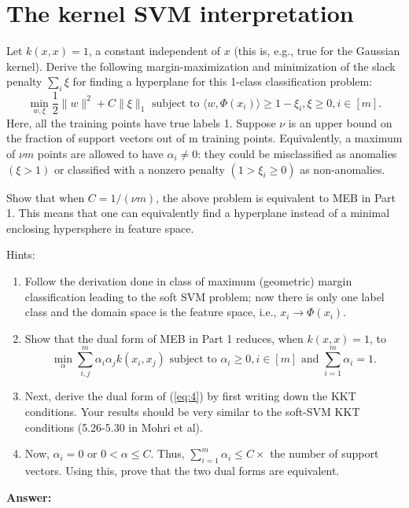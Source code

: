 \documentclass{article}
\begin{document}
\section{The kernel SVM interpretation}
Let $k(x, x) = 1$, a constant independent of $x$ (this is, e.g., true for the Gaussian kernel).
Derive the following margin-maximization and minimization of the slack penalty $\sum_i\xi$ for finding a hyperplane for this 1-class classification problem:
\begin{equation}\label{eq:4}
\min_{w,\xi}{\frac{1}{2}\|w\|^2 + C\|\xi\|_1} \text{ subject to } \langle w, \Phi(x_i)\rangle \geq 1 - \xi_i, \xi \geq 0, i \in [m].
\end{equation}
Here, all the training points have true labels 1. Suppose $\nu$ is an upper bound on the fraction of support vectors out of m training points.
Equivalently, a maximum of $\nu m$ points are allowed to have $\alpha_i \neq 0$: they could be misclassified as anomalies $(\xi > 1)$ or classified with a nonzero penalty $(1 > \xi_i \geq 0)$ as non-anomalies.

Show that when $C = 1 / (\nu m)$, the above problem is equivalent to MEB in Part 1.
This means that one can equivalently find a hyperplane instead of a minimal enclosing hypersphere in feature space.

Hints:
\begin{enumerate}
    \item Follow the derivation done in class of maximum (geometric) margin classification leading to the soft SVM problem;
    now there is only one label class and the domain space is the feature space, i.e., $x_i \to \Phi(x_i)$.
    \item Show that the dual form of MEB in Part 1 reduces, when $k(x,x) = 1$, to
    $$\min_\alpha\sum_{i,j}^{m}{\alpha_i}{\alpha_j}k(x_i,x_j) \text{ subject to } \alpha_i \geq 0, i \in [m] \text{ and } \sum_{i=1}^{m}{\alpha_i} = 1.$$
    \item Next, derive the dual form of (\ref*{eq:4}) by first writing down the KKT conditions.
    Your results should be very similar to the soft-SVM KKT conditions (5.26-5.30 in Mohri et al).
    \item Now, $\alpha_i = 0$ or $0 < \alpha \leq C$.
    Thus, $\sum_{i=1}^{m}{\alpha_i} \leq C \times$ the number of support vectors.
    Using this, prove that the two dual forms are equivalent.
\end{enumerate}

\textbf{Answer:}
\end{document}
